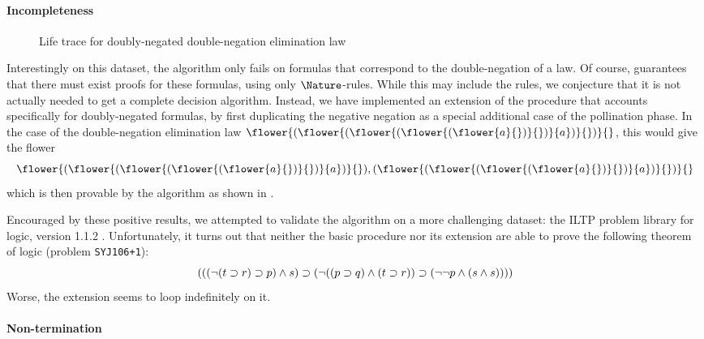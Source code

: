 \paragraph{Incompleteness}

\begin{figure*}
  
  \caption{Life trace for doubly-negated double-negation elimination law}
\end{figure*}

Interestingly on this dataset, the algorithm only fails on formulas that
correspond to the double-negation of a  law. Of course,
 guarantees that there must exist proofs for these
formulas, using only $\Nature$-rules. While this may include the 
rules, we conjecture that it is not actually needed to get a complete decision
algorithm. Instead, we have implemented an extension of the 
procedure that accounts specifically for doubly-negated formulas, by first
duplicating the negative negation as a special additional case of the
pollination phase. In the case of the double-negation elimination law
$\flower{(\flower{(\flower{(\flower{(\flower{a}{})}{})}{a})}{})}{}$, this
would give the flower
$$\flower{(\flower{(\flower{(\flower{(\flower{a}{})}{})}{a})}{}),
(\flower{(\flower{(\flower{(\flower{a}{})}{})}{a})}{})}{}$$
which is then provable by the algorithm as shown in .

Encouraged by these positive results, we attempted to validate the algorithm on
a more challenging dataset: the ILTP problem library for  logic,
version 1.1.2 . Unfortunately, it turns out that
neither the basic  procedure nor its extension are able to prove
the following theorem of  logic (problem \texttt{SYJ106+1}):
$$(((\neg (t \supset r) \supset p) \land s) \supset (\neg ((p \supset q) \land (t \supset
r)) \supset (\neg \neg p \land (s \land s))))$$
Worse, the extension seems to loop indefinitely on it.

\paragraph{Non-termination}

